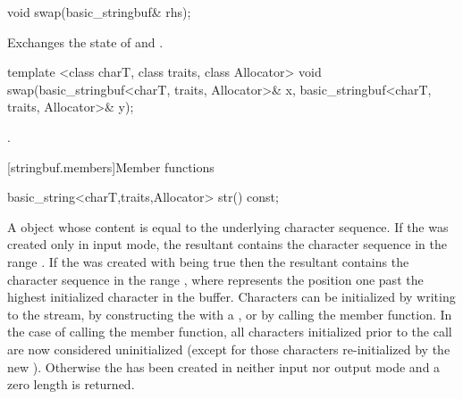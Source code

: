 %
%
\begin{itemdecl}
void swap(basic_stringbuf& rhs);
\end{itemdecl}

\begin{itemdescr}
\pnum
\effects Exchanges the state of 
and .
\end{itemdescr}

%
%
\begin{itemdecl}
template <class charT, class traits, class Allocator>
void swap(basic_stringbuf<charT, traits, Allocator>& x,
          basic_stringbuf<charT, traits, Allocator>& y);
\end{itemdecl}

\begin{itemdescr}
\pnum
\effects {}.
\end{itemdescr}

[stringbuf.members]{Member functions}

%
\begin{itemdecl}
basic_string<charT,traits,Allocator> str() const;
\end{itemdecl}

\begin{itemdescr}
\pnum
\returns
A
object whose content is equal to the
underlying character sequence.
If the  was created only in input mode, the resultant
 contains the character sequence in the range
. If the  was created with
 being true then the resultant 
contains the character sequence in the range , where
 represents the position one past the highest initialized character
in the buffer. Characters can be initialized by writing to the stream, by constructing
the  with a , or by calling the
 member function. In the case of calling the
 member function, all characters initialized prior to
the call are now considered uninitialized (except for those characters re-initialized
by the new ). Otherwise the  has been created
in neither input nor output mode and a zero length  is returned. 
\end{itemdescr}

